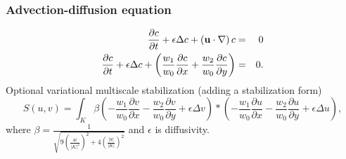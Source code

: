 \documentclass{beamer}
\begin{document}
\begin{frame}
\frametitle{Advection-diffusion equation}
\begin{eqnarray}
{\partial c \over\partial t} + \epsilon\Delta{c} + \left(\bf{u}\cdot\nabla\right) c & = & 0\\
{\partial c \over\partial t} + \epsilon\Delta{c} + \left(\frac{w_1}{w_0} \frac{\partial c}{\partial x} + \frac{w_2}{w_0} \frac{\partial c}{\partial y}\right) & = & 0.
\end{eqnarray}
Optional variational multiscale stabilization (adding a stabilization form)
\begin{equation}
S\left(u, v\right) = \int_{K} \beta \left(-\frac{w_1}{w_0} \frac{\partial v}{\partial x} - \frac{w_2}{w_0} \frac{\partial v}{\partial y} + \epsilon \Delta v\right) * \left(-\frac{w_1}{w_0} \frac{\partial u}{\partial x} - \frac{w_2}{w_0} \frac{\partial u}{\partial y} + \epsilon \Delta u\right),
\end{equation}
where
$\beta = \frac{1}{\sqrt{9 \left(\frac{4\epsilon}{|K|^2}\right)^2 + 4 \left(\frac{|u|}{|K|}\right)^2}}$ 
and $\epsilon$ is diffusivity.
\end{frame}
\end{document}
